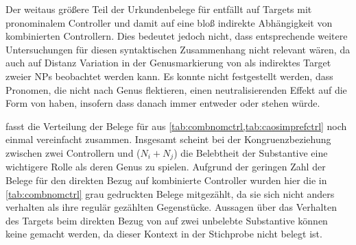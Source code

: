 Der weitaus größere Teil der Urkundenbelege für  entfällt auf
Targets mit pro\-nomi\-nalem Controller und damit auf eine bloß indirekte
Abhängigkeit von kombinierten Controllern. Dies bedeutet jedoch nicht, dass
entsprechende weitere Untersuchungen für diesen syntaktischen Zusammenhang
nicht relevant wären, da auch auf Distanz Variation in der Genusmarkierung von
 als indirektes Target zweier NPs beobachtet werden kann. 
Es konnte nicht festgestellt werden, dass Pronomen, die nicht
nach Genus flektieren, einen neutralisierenden Effekt auf die Form von
 haben, insofern dass danach immer entweder  oder  stehen würde.

 fasst die Verteilung der Belege für 
aus \cref{tab:combnomctrl,tab:caosimprefctrl} noch einmal vereinfacht zusammen.
Insgesamt scheint bei der Kongruenzbeziehung zwischen zwei Controllern und
 ($N_i + N_j$) die Belebtheit der Substantive eine wichtigere
Rolle als deren Genus zu spielen. Aufgrund der geringen Zahl der Belege für den
direkten Bezug auf kombinierte Controller wurden hier die in
\cref{tab:combnomctrl} grau gedruckten Belege mitgezählt, da sie sich nicht
anders verhalten als ihre regulär gezählten Gegenstücke. Aussagen über das
Verhalten des Targets beim direkten Bezug von  auf zwei unbelebte
Substantive können keine gemacht werden, da dieser Kontext in der Stichprobe
nicht belegt ist.

